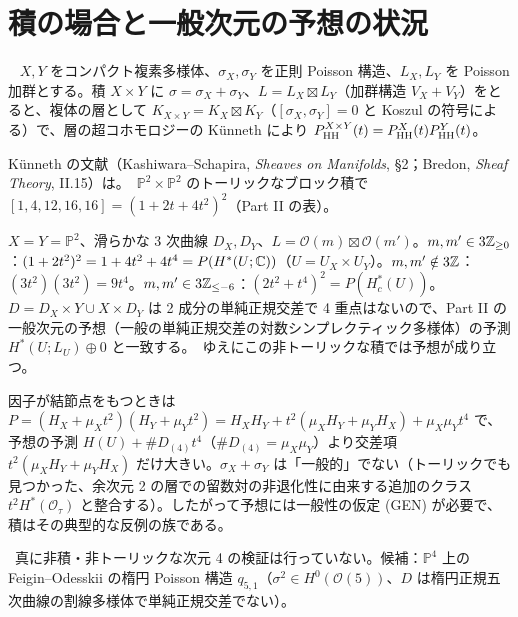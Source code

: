 \section{積の場合と一般次元の予想の状況}\label{sec:prod}
\begin{prop}[Künneth]\tP\ \tQ\label{prop:Kunneth}
$X,Y$ をコンパクト複素多様体、$\sigma_X,\sigma_Y$ を正則 Poisson 構造、$L_X,L_Y$ を Poisson 加群とする。積 $X\times Y$ に $\sigma=\sigma_X+\sigma_Y$、$L=L_X\boxtimes L_Y$（加群構造 $V_X+V_Y$）をとると、複体の層として $K_{X\times Y}=K_X\boxtimes K_Y$（$[\sigma_X,\sigma_Y]=0$ と Koszul の符号による）で、層の超コホモロジーの Künneth により $P^{X\times Y}_{\mathrm{HH}}(t)=P^X_{\mathrm{HH}}(t)P^Y_{\mathrm{HH}}(t)$。
\end{prop}
\noindent Künneth の文献（Kashiwara--Schapira, \emph{Sheaves on Manifolds}, \S2；Bredon, \emph{Sheaf Theory}, II.15）は\tQ。\tV\ $\mathbb P^2\times\mathbb P^2$ のトーリックなブロック積で $[1,4,12,16,16]=(1+2t+4t^2)^2$（Part II の表）。
\begin{ex}\tP\label{ex:prod33}
$X=Y=\mathbb P^2$、滑らかな 3 次曲線 $D_X,D_Y$、$L=\mathcal O(m)\boxtimes\mathcal O(m')$。$m,m'\in3\mathbb Z_{\ge0}$：$(1+2t^2)^2=1+4t^2+4t^4=P(H^*(U;\mathbb C))$（$U=U_X\times U_Y$）。$m,m'\notin3\mathbb Z$：$(3t^2)(3t^2)=9t^4$。$m,m'\in3\mathbb Z_{\le-6}$：$(2t^2+t^4)^2=P(H_c^*(U))$。$D=D_X\times Y\cup X\times D_Y$ は 2 成分の単純正規交差で 4 重点はないので、Part II の一般次元の予想（一般の単純正規交差の対数シンプレクティック多様体）の予測 $H^*(U;L_U)\oplus0$ と一致する。\tP\ ゆえにこの非トーリックな積では予想が成り立つ。
\end{ex}
\begin{rem}\tP
因子が結節点をもつときは $P=(H_X+\mu_Xt^2)(H_Y+\mu_Yt^2)=H_XH_Y+t^2(\mu_XH_Y+\mu_YH_X)+\mu_X\mu_Yt^4$ で、予想の予測 $H(U)+\#D_{(4)}t^4$（$\#D_{(4)}=\mu_X\mu_Y$）より交差項 $t^2(\mu_XH_Y+\mu_YH_X)$ だけ大きい。$\sigma_X+\sigma_Y$ は「一般的」でない（トーリックでも見つかった、余次元 2 の層での留数対の非退化性に由来する追加のクラス $t^2H^*(\mathcal O_\tau)$ と整合する）。したがって予想には一般性の仮定 (GEN) が必要で、積はその典型的な反例の族である。
\end{rem}
\noindent \tK\ 真に非積・非トーリックな次元 4 の検証は行っていない。候補：$\mathbb P^4$ 上の Feigin--Odesskii の楕円 Poisson 構造 $q_{5,1}$（$\sigma^2\in H^0(\mathcal O(5))$、$D$ は楕円正規五次曲線の割線多様体で単純正規交差でない）。

